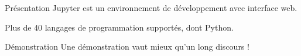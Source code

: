 \begin{frame}{Présentation}
  Jupyter est un environnement de développement avec interface web.

  Plus de 40 langages de programmation supportés, dont Python.

\end{frame}

\begin{frame}{Démonstration}
  Une démonstration vaut mieux qu'un long discours !

\end{frame}


